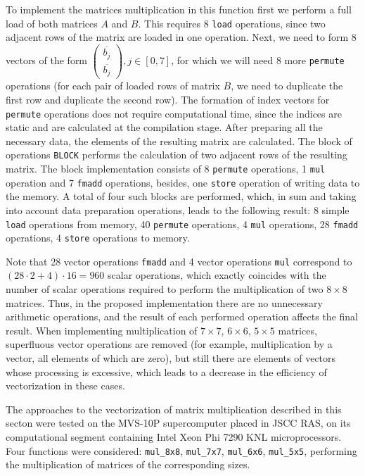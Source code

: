 \documentclass[
11pt,%
tightenlines,%
twoside,%
onecolumn,%
nofloats,%
nobibnotes,%
nofootinbib,%
superscriptaddress,%
noshowpacs,%
centertags]%
{revtex4}
\begin{document}
To implement the matrices multiplication in this function first we perform a full load of both matrices $A$ and $B$.
This requires 8 \texttt{load} operations, since two adjacent rows of the matrix are loaded in one operation.
Next, we need to form 8 vectors of the form $\begin{pmatrix} \overline{b_j} \\ \overline{b_j} \end{pmatrix}, j \in [0, 7]$, for which we will need 8 more \texttt{permute} operations (for each pair of loaded rows of matrix $B$, we need to duplicate the first row and duplicate the second row).
The formation of index vectors for \texttt{permute} operations does not require computational time, since the indices are static and are calculated at the compilation stage.
After preparing all the necessary data, the elements of the resulting matrix are calculated.
The block of operations \texttt{BLOCK} performs the calculation of two adjacent rows of the resulting matrix.
The block implementation consists of 8 \texttt{permute} operations, 1 \texttt{mul} operation and 7 \texttt{fmadd} operations, besides, one \texttt{store} operation of writing data to the memory.
A total of four such blocks are performed, which, in sum and taking into account data preparation operations, leads to the following result: 8 simple \texttt{load} operations from memory, 40 \texttt{permute} operations, 4 \texttt{mul} operations, 28 \texttt{fmadd} operations, 4 \texttt{store} operations to memory.

Note that 28 vector operations \texttt{fmadd} and 4 vector operations \texttt{mul} correspond to $(28 \cdot 2 + 4) \cdot 16 = 960$ scalar operations, which exactly coincides with the number of scalar operations required to perform the multiplication of two $8 \times 8$ matrices.
Thus, in the proposed implementation there are no unnecessary arithmetic operations, and the result of each performed operation affects the final result.
When implementing multiplication of $7 \times 7$, $6 \times 6$, $5 \times 5$ matrices, superfluous vector operations are removed (for example, multiplication by a vector, all elements of which are zero), but still there are elements of vectors whose processing is excessive, which leads to a decrease in the efficiency of vectorization in these cases.

The approaches to the vectorization of matrix multiplication described in this secton were tested on the MVS-10P supercomputer placed in JSCC RAS, on its computational segment containing Intel Xeon Phi 7290 KNL microprocessors.
Four functions were considered: \texttt{mul\_8x8}, \texttt{mul\_7x7}, \texttt{mul\_6x6}, \texttt{mul\_5x5}, performing the multiplication of matrices of the corresponding sizes.
\end{document}
